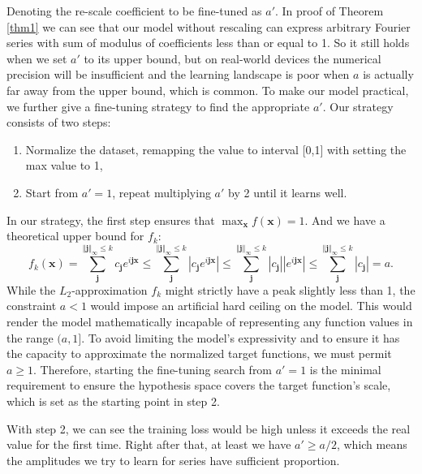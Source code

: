 \documentclass{article}
\theoremstyle{plain}
\theoremstyle{definition}
\theoremstyle{remark}
\begin{document}
Denoting the re-scale coefficient to be fine-tuned as $a'$.
In proof of Theorem \ref{thm1} we can see that our model without rescaling can express arbitrary Fourier series with sum of modulus of coefficients less than or equal to 1. So it still holds when we set $a'$ to its upper bound, but on real-world devices the numerical precision will be insufficient and the learning landscape is poor when $a$ is actually far away from the upper bound, which is common. To make our model practical, we further give a fine-tuning strategy to find the appropriate $a'$. Our strategy consists of two steps:
\begin{enumerate}
    \item Normalize the dataset, remapping the value to interval [0,1] with setting the max value to 1,
    \item Start from $a'=1$, repeat multiplying $a'$ by 2 until it learns well.
\end{enumerate}
In our strategy, the first step ensures that $\max_{\boldsymbol{x}} f(\boldsymbol{x})=1$. And we have a theoretical upper bound for $f_k$:
\begin{equation*}
f_k(\boldsymbol{x}) = \sum_{\boldsymbol{j}}^{\Vert \boldsymbol{j} \Vert_\infty \leq k}c_{\boldsymbol{j}}e^{i\boldsymbol{j}\boldsymbol{x}}
\leq 
\sum_{\boldsymbol{j}}^{\Vert \boldsymbol{j}\Vert_\infty \leq k}|c_{\boldsymbol{j}}e^{i\boldsymbol{j}\boldsymbol{x}}|
\leq
\sum_{\boldsymbol{j}}^{\Vert \boldsymbol{j}\Vert_\infty \leq k}|c_{\boldsymbol{j}}||e^{i\boldsymbol{j}\boldsymbol{x}}|
\leq
\sum_{\boldsymbol{j}}^{\Vert \boldsymbol{j}\Vert_\infty \leq k} |c_{\boldsymbol{j}}| = a.
\end{equation*}
While the $L_2$-approximation $f_k$ might strictly have a peak slightly less than 1, the constraint $a < 1$ would impose an artificial hard ceiling on the model. This would render the model mathematically incapable of representing any function values in the range $(a, 1]$. To avoid limiting the model's expressivity and to ensure it has the capacity to approximate the normalized target functions, we must permit $a \geq 1$. Therefore, starting the fine-tuning search from $a'=1$ is the minimal requirement to ensure the hypothesis space covers the target function's scale, which is set as the starting point in step 2.

With step 2, we can see the training loss would be high unless it exceeds the real value for the first time. Right after that, at least we have $a'\geq a/2$, which means the amplitudes we try to learn for series have sufficient proportion. 
\end{document}
